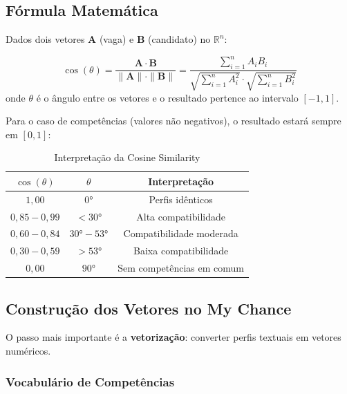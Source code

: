 \documentclass[12pt,a4paper]{article}
\begin{document}
\subsection{Fórmula Matemática}

Dados dois vetores $\mathbf{A}$ (vaga) e $\mathbf{B}$ (candidato) no $\mathbb{R}^n$:

\begin{formulabox}
\begin{equation}
  \cos(\theta) = \frac{\mathbf{A} \cdot \mathbf{B}}{\|\mathbf{A}\| \cdot \|\mathbf{B}\|}
  = \frac{\sum_{i=1}^{n} A_i B_i}{\sqrt{\sum_{i=1}^{n} A_i^2} \cdot \sqrt{\sum_{i=1}^{n} B_i^2}}
  \label{eq:cosine}
\end{equation}
onde $\theta$ é o ângulo entre os vetores e o resultado pertence ao intervalo $[-1, 1]$.
\end{formulabox}

\vspace{0.4cm}

Para o caso de competências (valores não negativos), o resultado estará sempre em $[0, 1]$:

\begin{table}[H]
\centering
\caption{Interpretação da Cosine Similarity}
\begin{tabular}{c|c|c}
  \toprule
  $\cos(\theta)$ & $\theta$ & Interpretação \\
  \midrule
  $1{,}00$            & $0°$   & Perfis idênticos \\
  $0{,}85 - 0{,}99$  & $< 30°$ & Alta compatibilidade \\
  $0{,}60 - 0{,}84$  & $30°-53°$ & Compatibilidade moderada \\
  $0{,}30 - 0{,}59$  & $> 53°$ & Baixa compatibilidade \\
  $0{,}00$            & $90°$  & Sem competências em comum \\
  \bottomrule
\end{tabular}
\end{table}

\subsection{Construção dos Vetores no My Chance}

O passo mais importante é a \textbf{vetorização}: converter perfis textuais em vetores numéricos.

\subsubsection{Vocabulário de Competências}
\end{document}
